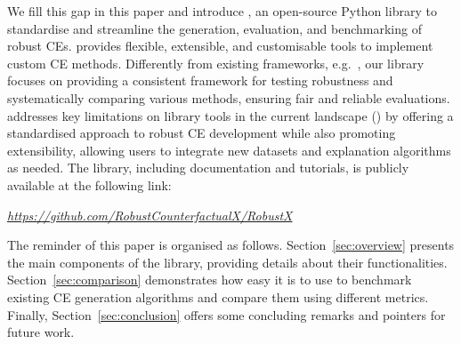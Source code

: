 We fill this gap in this paper and introduce \name, an open-source Python library to standardise and streamline the generation, evaluation, and benchmarking of robust CEs. \name{} provides flexible, extensible, and customisable tools to implement custom CE methods. Differently from existing frameworks, e.g.~\cite{PawelczykBHRK21,AgarwalKSPJPZL22}, our library focuses on providing a consistent framework for testing robustness and systematically comparing various methods, ensuring fair and reliable evaluations. \name{} addresses key limitations on library tools in the current landscape (\cite{DBLP:conf/ijcai/KeaneKDS21,ijcai2024survey}) by offering a standardised approach to robust CE development while also promoting extensibility, allowing users to integrate new datasets and explanation algorithms as needed. The library, including documentation and tutorials, is publicly available at the following link: 
\begin{center}
    \textit{\url{https://github.com/RobustCounterfactualX/RobustX}}
\end{center}

The reminder of this paper is organised as follows. Section~\ref{sec:overview} presents the main components of the library, providing details about their functionalities. Section~\ref{sec:comparison} demonstrates how easy it is to use \name{} to benchmark existing CE generation algorithms and compare them using different metrics. Finally, Section~\ref{sec:conclusion} offers some concluding remarks and pointers for future work.

 
